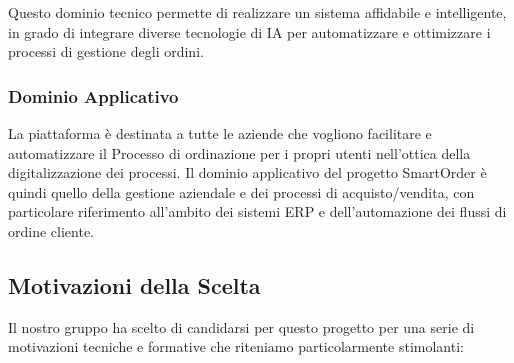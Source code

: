 \documentclass[a4paper,12pt]{article}
\begin{document}
Questo dominio tecnico permette di realizzare un sistema affidabile e intelligente, in grado di integrare diverse tecnologie di IA per automatizzare e ottimizzare i processi di gestione degli ordini.

\subsubsection{Dominio Applicativo}
La piattaforma è destinata a tutte le aziende che vogliono facilitare e automatizzare il Processo di ordinazione per i propri utenti nell’ottica della digitalizzazione dei processi. Il dominio applicativo del progetto SmartOrder è quindi quello della gestione aziendale e dei processi di acquisto/vendita, con particolare riferimento all’ambito dei sistemi ERP e dell’automazione dei flussi di ordine cliente.

\subsection{Motivazioni della Scelta}
Il nostro gruppo ha scelto di candidarsi per questo progetto per una serie di motivazioni tecniche e formative che riteniamo particolarmente stimolanti:
\end{document}
